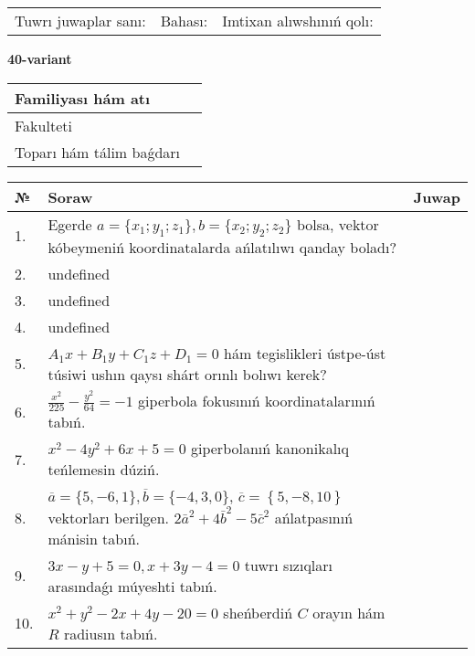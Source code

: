 \documentclass{article}
\begin{document}
\vspace{0.7cm}

\begin{tabular}{lll}
Tuwrı juwaplar sanı: \underline{\hspace{1cm}} & 
Bahası: \underline{\hspace{1cm}} & 
Imtixan alıwshınıń qolı: \underline{\hspace{2cm}} \\
\end{tabular}

\egroup

\newpage


\textbf{40-variant}\\

\bgroup
\def\arraystretch{1.6} %

\begin{tabular}{|m{5.7cm}|m{9.5cm}|}
\hline
Familiyası hám atı & \\
\hline
Fakulteti  & \\
\hline
Toparı hám tálim baǵdarı  & \\
\hline
\end{tabular}

\vspace{0.7cm}

\begin{tabular}{|m{0.7cm}|m{10cm}|m{4cm}|}
\hline
№ & Soraw & Juwap \\
\hline
1. & Egerde \(a = \{ x_{1}; y_{1}; z_{1}\}, b = \{ x_{2}; y_{2}; z_{2}\}\) bolsa, vektor kóbeymeniń koordinatalarda ańlatılıwı qanday boladı? &  \\
\hline
2. & undefined &  \\
\hline
3. & undefined &  \\
\hline
4. & undefined &  \\
\hline
5. & \(A_{1}x + B_{1}y + C_{1}z + D_{1} = 0\) hám tegislikleri ústpe-úst túsiwi ushın qaysı shárt orınlı bolıwı kerek? &  \\
\hline
6. & \(\frac{x^{2}}{225} - \frac{y^{2}}{64} = - 1\) giperbola fokusınıń koordinatalarınıń tabıń. &  \\
\hline
7. & \(x^{2} - 4 y^{2} + 6 x + 5 = 0\) giperbolanıń kanonikalıq teńlemesin dúziń. &  \\
\hline
8. & \(\overline{a} = \{5,- 6, 1 \}, \overline{b} = \{ - 4, 3, 0 \} \), \(\overline{c} = \left\{ 5,- 8, 10 \right\}\) vektorları berilgen. \(2{\bar{a}}^{2} + 4{\bar{b}}^{2} - 5{\bar{c}}^{2}\) ańlatpasınıń mánisin tabıń. &  \\
\hline
9. & \(3 x - y + 5 = 0, x + 3 y - 4 = 0\) tuwrı sızıqları arasındaǵı múyeshti tabıń. &  \\
\hline
10. & \(x^{2} + y^{2} - 2 x + 4 y - 20 = 0\) sheńberdiń \(C\) orayın hám \(R\) radiusın tabıń. & \\
\hline
\end{tabular}
\end{document}
